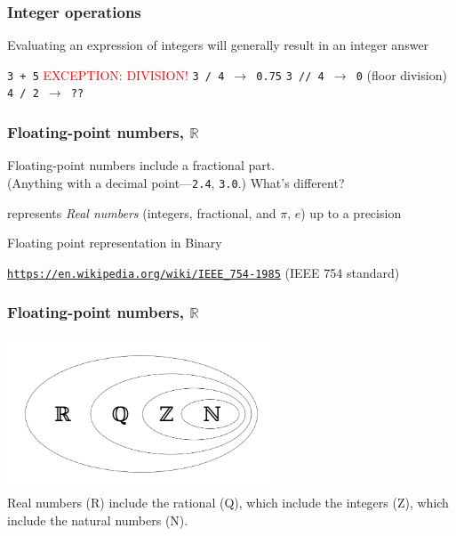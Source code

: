 \documentclass[11pt]{beamer}
\begin{document}
\begin{frame}
  \frametitle{Integer operations}
  \Enlarge

  \begin{itemize}
  \myitem  Evaluating an expression of integers will generally result in an integer answer
    \begin{itemize}
    \mysubitem  \texttt{3 + 5} \pause
    \mysubitem  \textcolor{red}{EXCEPTION:  DIVISION!} \pause
    \mysubitem  \texttt{3 / 4 $\rightarrow$ 0.75} \pause
    \mysubitem  \texttt{3 // 4 $\rightarrow$ 0} (floor division)\pause
    \mysubitem  \texttt{4 / 2 $\rightarrow$ ??}
    \end{itemize}
  \end{itemize}
\end{frame}

\begin{frame}
  \frametitle{Floating-point numbers, $\mathbb{R}$}
  \Enlarge

  \begin{itemize}
  \myitem  Floating-point numbers include a fractional part. \\
    \textcolor{CS101GradBot}{(Anything with a decimal point---\texttt{2.4}, \texttt{3.0}.)} \pause
  \myitem  What's different? \pause
    \begin{itemize}
    \mysubitem  represents \emph{Real numbers} (integers, fractional, and $\pi$, $e$) 
    \mysubitem  up to a precision \pause
    \end{itemize}
  \myitem Floating point representation in Binary
  \end{itemize}
  \hspace{7mm}\textcolor{blue}{\small \texttt{\url{https://en.wikipedia.org/wiki/IEEE_754-1985}}} {\small(IEEE 754 standard)}
\end{frame}

\begin{frame}
  \frametitle{Floating-point numbers, $\mathbb{R}$}
  \Enlarge
  \begin{center}
  \includegraphics[width=0.6\textwidth]{./img/Numbersystems.png}\\
  Real numbers (R) include the rational (Q), which include the integers (Z), which include the natural numbers (N).
  \end{center}
\end{frame}
\end{document}
